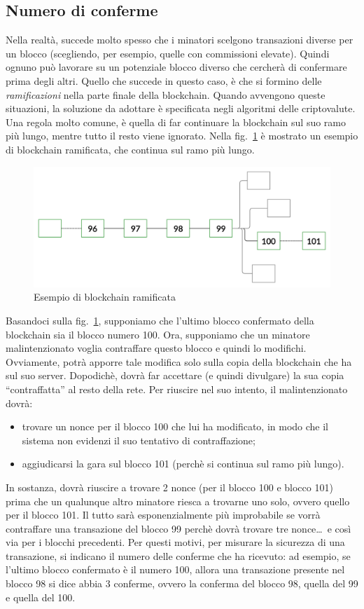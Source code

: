 \subsection{Numero di conferme}
Nella realtà, succede molto spesso che i minatori scelgono transazioni diverse per un blocco (scegliendo, per esempio, quelle con commissioni elevate). Quindi ognuno può lavorare su un potenziale blocco diverso che cercherà di confermare prima degli altri. Quello che succede in questo caso, \`e che si formino delle \textit{ramificazioni} nella parte finale della blockchain. Quando avvengono queste situazioni, la soluzione da adottare \`e specificata negli algoritmi delle criptovalute. Una regola molto comune, \`e quella di far continuare la blockchain sul suo ramo più lungo, mentre tutto il resto viene ignorato. Nella fig.~\ref{im:rami} \`e mostrato un esempio di blockchain ramificata, che continua sul ramo più lungo.
\begin{figure}
\centering
\includegraphics[scale=0.18]{immagini/cap2/3-rami} 
\caption{Esempio di blockchain ramificata}
\label{im:rami} 
\end{figure}
Basandoci sulla fig.~\ref{im:rami}, supponiamo che l’ultimo blocco confermato della blockchain sia il blocco numero 100. Ora, supponiamo che un minatore malintenzionato voglia contraffare questo blocco e quindi lo modifichi. Ovviamente, potrà apporre tale modifica solo sulla copia della blockchain che ha sul suo server. Dopodich\`e, dovrà far accettare (e quindi divulgare) la sua copia “contraffatta” al resto della rete.
Per riuscire nel suo intento, il malintenzionato dovrà:
\begin{itemize}
\item trovare un nonce per il blocco 100 che lui ha modificato, in modo che il sistema non evidenzi il suo tentativo di contraffazione;
\item aggiudicarsi la gara sul blocco 101 (perch\`e si continua sul ramo più lungo). 
\end{itemize}
In sostanza, dovrà riuscire a trovare 2 nonce (per il blocco 100 e blocco 101) prima che un qualunque altro minatore riesca a trovarne uno solo, ovvero quello per il blocco 101. 
Il tutto sarà esponenzialmente più improbabile se vorrà contraffare una transazione del blocco 99 perch\`e dovrà trovare tre nonce\dots\, e così via per i blocchi precedenti.
Per questi motivi, per misurare la sicurezza di una transazione, si indicano il numero delle conferme che ha ricevuto: ad esempio, se l’ultimo blocco confermato \`e il numero 100, allora una transazione presente nel blocco 98 si dice abbia 3 conferme, ovvero la conferma del blocco 98, quella del 99 e quella del 100.

